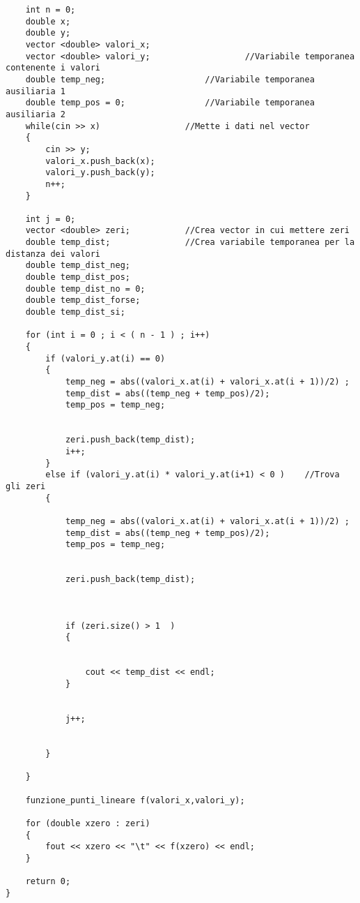 \begin{verbatim}
    int n = 0;
    double x;
    double y;
	vector <double> valori_x;
    vector <double> valori_y;					//Variabile temporanea contenente i valori
	double temp_neg;					//Variabile temporanea ausiliaria 1
	double temp_pos = 0;				//Variabile temporanea ausiliaria 2
	while(cin >> x)					//Mette i dati nel vector
	{
        cin >> y;
		valori_x.push_back(x);
        valori_y.push_back(y);
		n++;
	}

	int j = 0;
	vector <double> zeri;		    //Crea vector in cui mettere zeri
    double temp_dist;				//Crea variabile temporanea per la distanza dei valori
	double temp_dist_neg;
	double temp_dist_pos;
    double temp_dist_no = 0;
    double temp_dist_forse;
    double temp_dist_si;

    for (int i = 0 ; i < ( n - 1 ) ; i++)
	{
        if (valori_y.at(i) == 0)
        {
            temp_neg = abs((valori_x.at(i) + valori_x.at(i + 1))/2) ;
			temp_dist = abs((temp_neg + temp_pos)/2);
            temp_pos = temp_neg;
            
            
            zeri.push_back(temp_dist);
            i++;
        }
		else if (valori_y.at(i) * valori_y.at(i+1) < 0 )	//Trova gli zeri
		{
        
            temp_neg = abs((valori_x.at(i) + valori_x.at(i + 1))/2) ;
			temp_dist = abs((temp_neg + temp_pos)/2);
            temp_pos = temp_neg;
            
            
            zeri.push_back(temp_dist);
        
			            
        
            if (zeri.size() > 1  )
            {
                
                
                cout << temp_dist << endl;
            }
            
            
			j++;
            
            
		}
            
	}
    
    funzione_punti_lineare f(valori_x,valori_y);
    
    for (double xzero : zeri)
    {
        fout << xzero << "\t" << f(xzero) << endl;
    }
    
    return 0;
}

\end{verbatim}
